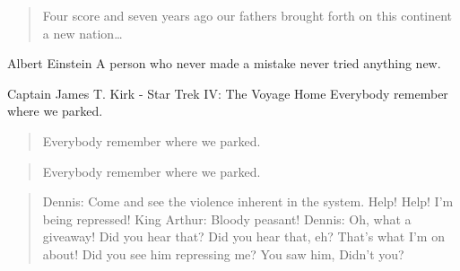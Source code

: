 \begin{quote}
Four score and seven years ago our fathers brought forth
on this continent a new nation…​\end{quote}

\begin{aquote}{Albert Einstein}
A person who never made a mistake never tried anything new.\end{aquote}

\begin{aquote}{Captain James T. Kirk - Star Trek IV: The Voyage Home}
Everybody remember where we parked.\end{aquote}

\begin{quote}
Everybody remember where we parked.\end{quote}

\begin{quote}
Everybody remember where we parked.\end{quote}

\begin{quote}
Dennis: Come and see the violence inherent in the system. Help! Help! I’m being repressed!
King Arthur: Bloody peasant!
Dennis: Oh, what a giveaway! Did you hear that? Did you hear that, eh? That’s what I’m on about! Did you see him repressing me? You saw him, Didn’t you?
\end{quote}
